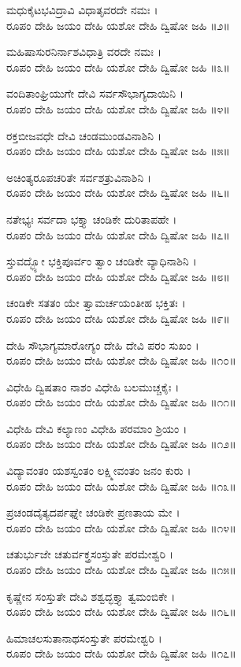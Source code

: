 ಮಧುಕೈಟಭವಿದ್ರಾವಿ ವಿಧಾತೃವರದೇ ನಮಃ ।\\
ರೂಪಂ ದೇಹಿ ಜಯಂ ದೇಹಿ ಯಶೋ ದೇಹಿ ದ್ವಿಷೋ ಜಹಿ ॥೨॥

ಮಹಿಷಾಸುರನಿರ್ನಾಶವಿಧಾತ್ರಿ ವರದೇ ನಮಃ ।\\
ರೂಪಂ ದೇಹಿ ಜಯಂ ದೇಹಿ ಯಶೋ ದೇಹಿ ದ್ವಿಷೋ ಜಹಿ ॥೩॥

ವಂದಿತಾಂಘ್ರಿಯುಗೇ ದೇವಿ ಸರ್ವಸೌಭಾಗ್ಯದಾಯಿನಿ ।\\
ರೂಪಂ ದೇಹಿ ಜಯಂ ದೇಹಿ ಯಶೋ ದೇಹಿ ದ್ವಿಷೋ ಜಹಿ ॥೪॥

ರಕ್ತಬೀಜವಧೇ ದೇವಿ ಚಂಡಮುಂಡವಿನಾಶಿನಿ ।\\
ರೂಪಂ ದೇಹಿ ಜಯಂ ದೇಹಿ ಯಶೋ ದೇಹಿ ದ್ವಿಷೋ ಜಹಿ ॥೫॥

ಅಚಿಂತ್ಯರೂಪಚರಿತೇ ಸರ್ವಶತ್ರುವಿನಾಶಿನಿ ।\\
ರೂಪಂ ದೇಹಿ ಜಯಂ ದೇಹಿ ಯಶೋ ದೇಹಿ ದ್ವಿಷೋ ಜಹಿ ॥೬॥

ನತೇಭ್ಯಃ ಸರ್ವದಾ ಭಕ್ತ್ಯಾ ಚಂಡಿಕೇ ದುರಿತಾಪಹೇ ।\\
ರೂಪಂ ದೇಹಿ ಜಯಂ ದೇಹಿ ಯಶೋ ದೇಹಿ ದ್ವಿಷೋ ಜಹಿ ॥೭॥

ಸ್ತುವದ್ಭ್ಯೋ ಭಕ್ತಿಪೂರ್ವಂ ತ್ವಾಂ ಚಂಡಿಕೇ ವ್ಯಾಧಿನಾಶಿನಿ ।\\
ರೂಪಂ ದೇಹಿ ಜಯಂ ದೇಹಿ ಯಶೋ ದೇಹಿ ದ್ವಿಷೋ ಜಹಿ ॥೮॥

ಚಂಡಿಕೇ ಸತತಂ ಯೇ ತ್ವಾಮರ್ಚಯಂತೀಹ ಭಕ್ತಿತಃ ।\\
ರೂಪಂ ದೇಹಿ ಜಯಂ ದೇಹಿ ಯಶೋ ದೇಹಿ ದ್ವಿಷೋ ಜಹಿ ॥೯॥

ದೇಹಿ ಸೌಭಾಗ್ಯಮಾರೋಗ್ಯಂ ದೇಹಿ ದೇವಿ ಪರಂ ಸುಖಂ ।\\
ರೂಪಂ ದೇಹಿ ಜಯಂ ದೇಹಿ ಯಶೋ ದೇಹಿ ದ್ವಿಷೋ ಜಹಿ ॥೧೦॥

ವಿಧೇಹಿ ದ್ವಿಷತಾಂ ನಾಶಂ ವಿಧೇಹಿ ಬಲಮುಚ್ಚಕೈಃ ।\\
ರೂಪಂ ದೇಹಿ ಜಯಂ ದೇಹಿ ಯಶೋ ದೇಹಿ ದ್ವಿಷೋ ಜಹಿ ॥೧೧॥

ವಿಧೇಹಿ ದೇವಿ ಕಲ್ಯಾಣಂ ವಿಧೇಹಿ ಪರಮಾಂ ಶ್ರಿಯಂ ।\\
ರೂಪಂ ದೇಹಿ ಜಯಂ ದೇಹಿ ಯಶೋ ದೇಹಿ ದ್ವಿಷೋ ಜಹಿ ॥೧೨॥

ವಿದ್ಯಾವಂತಂ ಯಶಸ್ವಂತಂ ಲಕ್ಷ್ಮೀವಂತಂ ಜನಂ ಕುರು ।\\
ರೂಪಂ ದೇಹಿ ಜಯಂ ದೇಹಿ ಯಶೋ ದೇಹಿ ದ್ವಿಷೋ ಜಹಿ ॥೧೩॥

ಪ್ರಚಂಡದೈತ್ಯದರ್ಪಘ್ನೇ ಚಂಡಿಕೇ ಪ್ರಣತಾಯ ಮೇ ।\\
ರೂಪಂ ದೇಹಿ ಜಯಂ ದೇಹಿ ಯಶೋ ದೇಹಿ ದ್ವಿಷೋ ಜಹಿ ॥೧೪॥

ಚತುರ್ಭುಜೇ ಚತುರ್ವಕ್ತ್ರಸಂಸ್ತುತೇ ಪರಮೇಶ್ವರಿ ।\\
ರೂಪಂ ದೇಹಿ ಜಯಂ ದೇಹಿ ಯಶೋ ದೇಹಿ ದ್ವಿಷೋ ಜಹಿ ॥೧೫॥

ಕೃಷ್ಣೇನ ಸಂಸ್ತುತೇ ದೇವಿ ಶಶ್ವದ್ಭಕ್ತ್ಯಾ ತ್ವಮಂಬಿಕೇ ।\\
ರೂಪಂ ದೇಹಿ ಜಯಂ ದೇಹಿ ಯಶೋ ದೇಹಿ ದ್ವಿಷೋ ಜಹಿ ॥೧೬॥

ಹಿಮಾಚಲಸುತಾನಾಥಸಂಸ್ತುತೇ ಪರಮೇಶ್ವರಿ ।\\
ರೂಪಂ ದೇಹಿ ಜಯಂ ದೇಹಿ ಯಶೋ ದೇಹಿ ದ್ವಿಷೋ ಜಹಿ ॥೧೭॥

